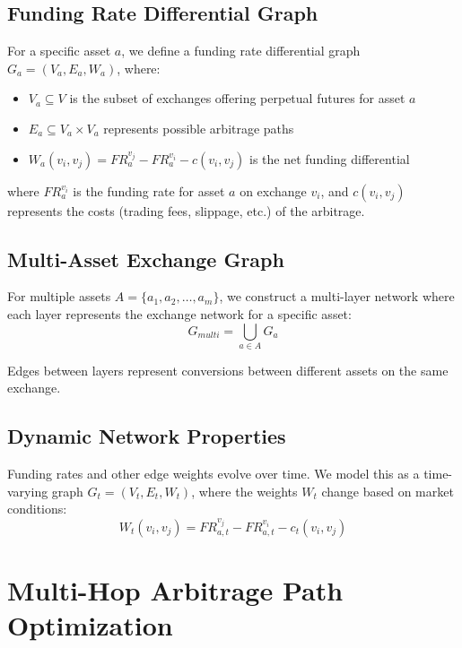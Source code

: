 \documentclass{article}
\begin{document}
\subsection{Funding Rate Differential Graph}

For a specific asset $a$, we define a funding rate differential graph $G_a = (V_a, E_a, W_a)$, where:
\begin{itemize}
    \item $V_a \subseteq V$ is the subset of exchanges offering perpetual futures for asset $a$
    \item $E_a \subseteq V_a \times V_a$ represents possible arbitrage paths
    \item $W_a(v_i, v_j) = FR_a^{v_j} - FR_a^{v_i} - c(v_i, v_j)$ is the net funding differential
\end{itemize}
where $FR_a^{v_i}$ is the funding rate for asset $a$ on exchange $v_i$, and $c(v_i, v_j)$ represents the costs (trading fees, slippage, etc.) of the arbitrage.

\subsection{Multi-Asset Exchange Graph}

For multiple assets $A = \{a_1, a_2, \ldots, a_m\}$, we construct a multi-layer network where each layer represents the exchange network for a specific asset:
\begin{equation}
G_{multi} = \bigcup_{a \in A} G_a
\end{equation}

Edges between layers represent conversions between different assets on the same exchange.

\subsection{Dynamic Network Properties}

Funding rates and other edge weights evolve over time. We model this as a time-varying graph $G_t = (V_t, E_t, W_t)$, where the weights $W_t$ change based on market conditions:
\begin{equation}
W_t(v_i, v_j) = FR_{a,t}^{v_j} - FR_{a,t}^{v_i} - c_t(v_i, v_j)
\end{equation}

\section{Multi-Hop Arbitrage Path Optimization}
\end{document}
